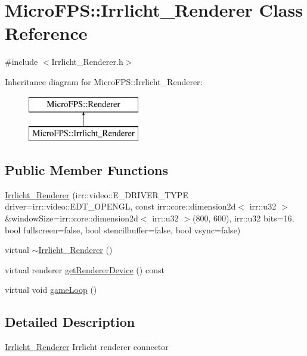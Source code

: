 \hypertarget{class_micro_f_p_s_1_1_irrlicht___renderer}{
\section{MicroFPS::Irrlicht\_\-Renderer Class Reference}
\label{d5/d5b/class_micro_f_p_s_1_1_irrlicht___renderer}
}


{\ttfamily \#include $<$Irrlicht\_\-Renderer.h$>$}

Inheritance diagram for MicroFPS::Irrlicht\_\-Renderer:\begin{figure}[H]
\begin{center}
\leavevmode
\includegraphics[height=2.000000cm]{d5/d5b/class_micro_f_p_s_1_1_irrlicht___renderer}
\end{center}
\end{figure}
\subsection*{Public Member Functions}
\begin{DoxyCompactItemize}
\item 
\hyperlink{class_micro_f_p_s_1_1_irrlicht___renderer_a9310435cb940f83daa7ec4e1b05ae555}{Irrlicht\_\-Renderer} (irr::video::E\_\-DRIVER\_\-TYPE driver=irr::video::EDT\_\-OPENGL, const irr::core::dimension2d$<$ irr::u32 $>$ \&windowSize=irr::core::dimension2d$<$ irr::u32 $>$(800, 600), irr::u32 bits=16, bool fullscreen=false, bool stencilbuffer=false, bool vsync=false)
\item 
virtual \hyperlink{class_micro_f_p_s_1_1_irrlicht___renderer_ab558709a3d5c1e582b00cb16bc3a5205}{$\sim$Irrlicht\_\-Renderer} ()
\item 
virtual renderer \hyperlink{class_micro_f_p_s_1_1_irrlicht___renderer_a6150c60d9599047f2d0ce468d4b3ac56}{getRendererDevice} () const 
\item 
virtual void \hyperlink{class_micro_f_p_s_1_1_irrlicht___renderer_ac719b88be714f1ece203d6dc3cce7ae2}{gameLoop} ()
\end{DoxyCompactItemize}


\subsection{Detailed Description}
\hyperlink{class_micro_f_p_s_1_1_irrlicht___renderer}{Irrlicht\_\-Renderer} Irrlicht renderer connector 

